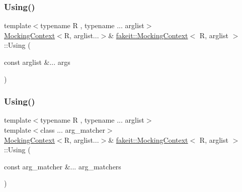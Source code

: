\subsubsection{\texorpdfstring{Using()}{Using()}\hspace{0.1cm}{\footnotesize\ttfamily [6/18]}}
{\footnotesize\ttfamily template$<$typename R , typename ... arglist$>$ \\
\mbox{\hyperlink{classfakeit_1_1MockingContext}{Mocking\+Context}}$<$R, arglist...$>$\& \mbox{\hyperlink{classfakeit_1_1MockingContext}{fakeit\+::\+Mocking\+Context}}$<$ R, arglist $>$\+::Using (\begin{DoxyParamCaption}\item[{const arglist \&...}]{args }\end{DoxyParamCaption})\hspace{0.3cm}{\ttfamily [inline]}}

\mbox{\label{classfakeit_1_1MockingContext_acb9bd9b011ac2ad88c8d08eebfa101ac}} 
\subsubsection{\texorpdfstring{Using()}{Using()}\hspace{0.1cm}{\footnotesize\ttfamily [7/18]}}
{\footnotesize\ttfamily template$<$typename R , typename ... arglist$>$ \\
template$<$class ... arg\+\_\+matcher$>$ \\
\mbox{\hyperlink{classfakeit_1_1MockingContext}{Mocking\+Context}}$<$R, arglist...$>$\& \mbox{\hyperlink{classfakeit_1_1MockingContext}{fakeit\+::\+Mocking\+Context}}$<$ R, arglist $>$\+::Using (\begin{DoxyParamCaption}\item[{const arg\+\_\+matcher \&...}]{arg\+\_\+matchers }\end{DoxyParamCaption})\hspace{0.3cm}{\ttfamily [inline]}}

\mbox{\label{classfakeit_1_1MockingContext_acb9bd9b011ac2ad88c8d08eebfa101ac}} 
